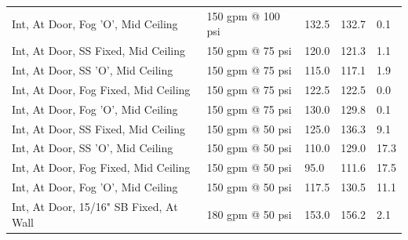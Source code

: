 \documentclass{book}
\begin{document}
\begin{table}[]
\begin{tabular}{lllll}
Int, At Door, Fog 'O', Mid Ceiling                    & 150 gpm @ 100 psi                   & 132.5                                  & 132.7                                   & 0.1                                     \\
Int, At Door, SS Fixed, Mid Ceiling                   & 150 gpm @ 75 psi                    & 120.0                                  & 121.3                                   & 1.1                                     \\
Int, At Door, SS 'O', Mid Ceiling                     & 150 gpm @ 75 psi                    & 115.0                                  & 117.1                                   & 1.9                                     \\
Int, At Door, Fog Fixed, Mid Ceiling                  & 150 gpm @ 75 psi                    & 122.5                                  & 122.5                                   & 0.0                                     \\
Int, At Door, Fog 'O', Mid Ceiling                    & 150 gpm @ 75 psi                    & 130.0                                  & 129.8                                   & 0.1                                     \\
Int, At Door, SS Fixed, Mid Ceiling                   & 150 gpm @ 50 psi                    & 125.0                                  & 136.3                                   & 9.1                                     \\
Int, At Door, SS 'O', Mid Ceiling                     & 150 gpm @ 50 psi                    & 110.0                                  & 129.0                                   & 17.3                                    \\
Int, At Door, Fog Fixed, Mid Ceiling                  & 150 gpm @ 50 psi                    & 95.0                                   & 111.6                                   & 17.5                                    \\
Int, At Door, Fog 'O', Mid Ceiling                    & 150 gpm @ 50 psi                    & 117.5                                  & 130.5                                   & 11.1                                    \\
Int, At Door, 15/16" SB Fixed, At Wall                & 180 gpm @ 50 psi                    & 153.0                                  & 156.2                                   & 2.1                                     \\

\end{tabular}
\end{table}
\end{document}

